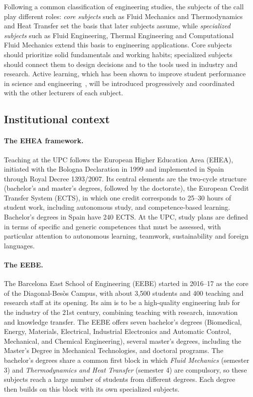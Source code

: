 \documentclass[11pt]{article}
\begin{document}
Following a common classification of engineering studies, the subjects of the call play
different roles: \emph{core subjects} such as Fluid Mechanics and Thermodynamics and Heat
Transfer set the basis that later subjects assume, while \emph{specialized subjects} such
as Fluid Engineering, Thermal Engineering and Computational Fluid Mechanics extend this
basis to engineering applications. Core subjects should prioritize solid fundamentals and
working habits; specialized subjects should connect them to design decisions and to the
tools used in industry and research. Active learning, which has been shown to improve
student performance in science and engineering~\cite{Freeman2014}, will be introduced
progressively and coordinated with the other lecturers of each subject.

\subsection{Institutional context}\label{sec:context}
\paragraph{The EHEA framework.} Teaching at the UPC follows the European Higher Education
Area (EHEA), initiated with the Bologna Declaration in 1999 and implemented in Spain
through Royal Decree 1393/2007. Its central elements are the two-cycle structure
(bachelor's and master's degrees, followed by the doctorate), the European Credit Transfer
System (ECTS), in which one credit corresponds to 25--30 hours of student work, including
autonomous study, and competence-based learning. Bachelor's degrees in Spain have 240
ECTS. At the UPC, study plans are defined in terms of specific and generic competences
that must be assessed, with particular attention to autonomous learning, teamwork,
sustainability and foreign languages.

\paragraph{The EEBE.} The Barcelona East School of Engineering (EEBE) started in 2016--17
as the core of the Diagonal-Bes\`os Campus, with about 3,500 students and 400 teaching and
research staff at its opening. Its aim is to be a high-quality engineering hub for the
industry of the 21st century, combining teaching with research, innovation and knowledge
transfer. The EEBE offers seven bachelor's degrees (Biomedical, Energy, Materials,
Electrical, Industrial Electronics and Automatic Control, Mechanical, and Chemical
Engineering), several master's degrees, including the Master's Degree in Mechanical
Technologies, and doctoral programs. The bachelor's degrees share a common first block in
which \emph{Fluid Mechanics} (semester 3) and \emph{Thermodynamics and Heat Transfer}
(semester 4) are compulsory, so these subjects reach a large number of students from
different degrees. Each degree then builds on this block with its own specialized
subjects.
\end{document}
